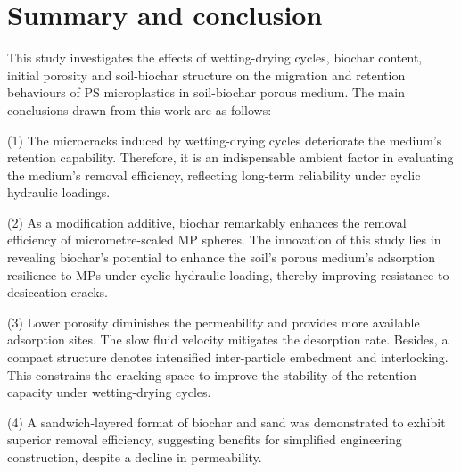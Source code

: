 \section{Summary and conclusion} \label{sec:5.5} %
This study investigates the effects of wetting-drying cycles, biochar content, initial porosity and soil-biochar structure on the migration and retention behaviours of PS microplastics in soil-biochar porous medium. The main conclusions drawn from this work are as follows: \par
(1)	The microcracks induced by wetting-drying cycles deteriorate the medium’s retention capability. Therefore, it is an indispensable ambient factor in evaluating the medium's removal efficiency, reflecting long-term reliability under cyclic hydraulic loadings. \par
(2)	As a modification additive, biochar remarkably enhances the removal efficiency of micrometre-scaled MP spheres. The innovation of this study lies in revealing biochar's potential to enhance the soil's porous medium’s adsorption resilience to MPs under cyclic hydraulic loading, thereby improving resistance to desiccation cracks. \par
(3)	Lower porosity diminishes the permeability and provides more available adsorption sites. The slow fluid velocity mitigates the desorption rate. Besides, a compact structure denotes intensified inter-particle embedment and interlocking. This constrains the cracking space to improve the stability of the retention capacity under wetting-drying cycles. \par
(4)	A sandwich-layered format of biochar and sand was demonstrated to exhibit superior removal efficiency, suggesting benefits for simplified engineering construction, despite a decline in permeability. \par
